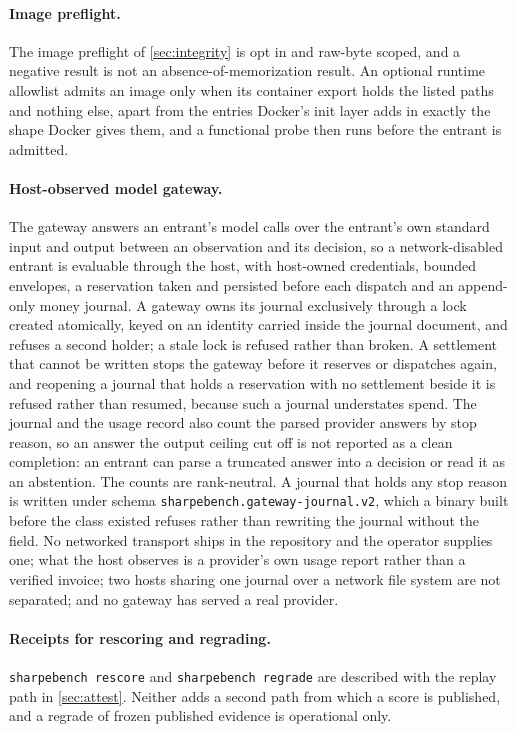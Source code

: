\paragraph{Image preflight.} The image preflight of \cref{sec:integrity} is opt in and raw-byte scoped, and a negative result is not an absence-of-memorization result. An optional runtime allowlist admits an image only when its container export holds the listed paths and nothing else, apart from the entries Docker's init layer adds in exactly the shape Docker gives them, and a functional probe then runs before the entrant is admitted.

\paragraph{Host-observed model gateway.} The gateway answers an entrant's model calls over the entrant's own standard input and output between an observation and its decision, so a network-disabled entrant is evaluable through the host, with host-owned credentials, bounded envelopes, a reservation taken and persisted before each dispatch and an append-only money journal. A gateway owns its journal exclusively through a lock created atomically, keyed on an identity carried inside the journal document, and refuses a second holder; a stale lock is refused rather than broken. A settlement that cannot be written stops the gateway before it reserves or dispatches again, and reopening a journal that holds a reservation with no settlement beside it is refused rather than resumed, because such a journal understates spend. The journal and the usage record also count the parsed provider answers by stop reason, so an answer the output ceiling cut off is not reported as a clean completion: an entrant can parse a truncated answer into a decision or read it as an abstention. The counts are rank-neutral. A journal that holds any stop reason is written under schema \texttt{sharpebench.gateway-journal.v2}, which a binary built before the class existed refuses rather than rewriting the journal without the field. No networked transport ships in the repository and the operator supplies one; what the host observes is a provider's own usage report rather than a verified invoice; two hosts sharing one journal over a network file system are not separated; and no gateway has served a real provider.

\paragraph{Receipts for rescoring and regrading.} \texttt{sharpebench rescore} and \texttt{sharpebench regrade} are described with the replay path in \cref{sec:attest}. Neither adds a second path from which a score is published, and a regrade of frozen published evidence is operational only.

